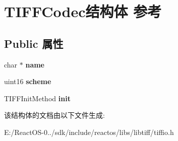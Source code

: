 \hypertarget{struct_t_i_f_f_codec}{}\section{T\+I\+F\+F\+Codec结构体 参考}
\label{struct_t_i_f_f_codec}
\subsection*{Public 属性}
\begin{DoxyCompactItemize}
\item 
\mbox{\label{struct_t_i_f_f_codec_a8bf5bc45b7ab2fd4fe83facf79838a2e}} 
char $\ast$ {\bfseries name}
\item 
\mbox{\label{struct_t_i_f_f_codec_a676e638ab8f54c903801cd2572cbbf01}} 
uint16 {\bfseries scheme}
\item 
\mbox{\label{struct_t_i_f_f_codec_a6a9741e4d83a2d4f16142fdba9878271}} 
T\+I\+F\+F\+Init\+Method {\bfseries init}
\end{DoxyCompactItemize}


该结构体的文档由以下文件生成\+:\begin{DoxyCompactItemize}
\item 
E\+:/\+React\+O\+S-\/0../sdk/include/reactos/libs/libtiff/tiffio.\+h\end{DoxyCompactItemize}
